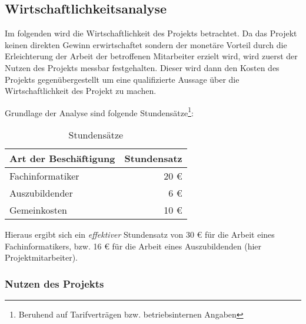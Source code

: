 \documentclass[12pt, xcolor=dvipsnames]{scrartcl}
\begin{document}
\subsection{Wirtschaftlichkeitsanalyse}
\label{sec:wirtschaftlichkeitsanalyse}

Im folgenden wird die Wirtschaftlichkeit des Projekts betrachtet. Da das Projekt keinen direkten Gewinn erwirtschaftet sondern der monetäre Vorteil durch die Erleichterung der Arbeit der betroffenen Mitarbeiter erzielt wird, wird zuerst der Nutzen des Projekts messbar festgehalten. Dieser wird dann den Kosten des Projekts gegenübergestellt um eine qualifizierte Aussage über die Wirtschaftlichkeit des Projekt zu machen.

Grundlage der Analyse sind folgende Stundensätze\footnote{Beruhend auf Tarifverträgen bzw. betriebsinternen Angaben}:

\begin{table}[H]
	\centering
	\begin{tabular}{lr}

		\rowcolor{white!15}				
		\textbf{Art der Beschäftigung} & \textbf{Stundensatz} \\\hline		
		
		Fachinformatiker & 20 \euro \\
		Auszubildender & 6 \euro \\
		Gemeinkosten & 10 \euro \\
			    
	\end{tabular}
	\caption{Stundensätze}
	\label{tab:stundensätze}
\end{table}

Hieraus ergibt sich ein \textit{effektiver} Stundensatz von 30 \euro{} für die Arbeit eines Fachinformatikers, bzw. 16 \euro{} für die Arbeit eines Auszubildenden (hier Projektmitarbeiter).


\subsubsection{Nutzen des Projekts}
\label{sec:nutzen_des_projekts}
\end{document}
